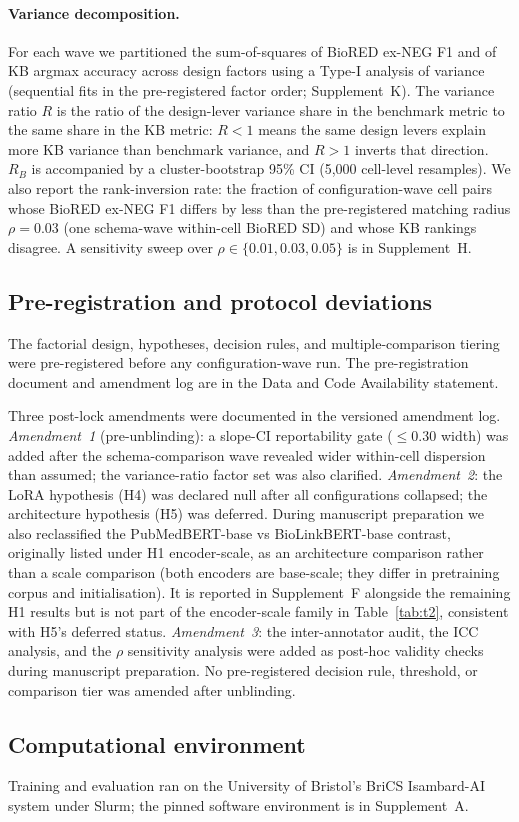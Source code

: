 \paragraph{Variance decomposition.}
For each wave we partitioned the sum-of-squares of BioRED ex-NEG F1
and of KB argmax accuracy across design factors using a Type-I
analysis of variance (sequential fits in the pre-registered factor
order; Supplement~K). The variance ratio \(R\) is the ratio of the
design-lever variance share in the benchmark metric to the same
share in the KB metric: \(R<1\) means the same design levers
explain more KB variance than benchmark variance, and \(R>1\)
inverts that direction. \(R_B\) is accompanied by a
cluster-bootstrap 95\% CI (5{,}000 cell-level resamples). We also
report the rank-inversion rate: the fraction of configuration-wave
cell pairs whose BioRED ex-NEG F1 differs by less than the
pre-registered matching radius \(\rho=0.03\) (one schema-wave
within-cell BioRED SD) and whose KB rankings disagree. A sensitivity
sweep over \(\rho\in\{0.01, 0.03, 0.05\}\) is in Supplement~H.

\subsection{Pre-registration and protocol deviations}
\label{sec:prereg}

The factorial design, hypotheses, decision rules, and
multiple-comparison tiering were pre-registered
\citep{nosek2018preregistration} before any configuration-wave run.
The pre-registration document and amendment log are in the Data and
Code Availability statement.

Three post-lock amendments were documented in the versioned amendment
log. \emph{Amendment~1} (pre-unblinding): a slope-CI reportability
gate (\(\leq 0.30\) width) was added after the schema-comparison
wave revealed wider within-cell dispersion than assumed; the
variance-ratio factor set was also clarified.
\emph{Amendment~2}: the LoRA hypothesis (H4) was declared null
after all configurations collapsed; the architecture hypothesis
(H5) was deferred. During manuscript preparation we also
reclassified the PubMedBERT-base vs BioLinkBERT-base contrast,
originally listed under H1 encoder-scale, as an
architecture comparison rather than a scale comparison (both
encoders are base-scale; they differ in pretraining corpus and
initialisation). It is reported in Supplement~F alongside the
remaining H1 results but is not part of the encoder-scale family
in Table~\ref{tab:t2}, consistent with H5's deferred status.
\emph{Amendment~3}: the inter-annotator audit, the ICC analysis,
and the \(\rho\) sensitivity analysis were added as post-hoc
validity checks during manuscript preparation. No pre-registered
decision rule, threshold, or comparison tier was amended after
unblinding.

\subsection{Computational environment}

Training and evaluation ran on the University of Bristol's BriCS
Isambard-AI system under Slurm; the pinned software environment is
in Supplement~A.
